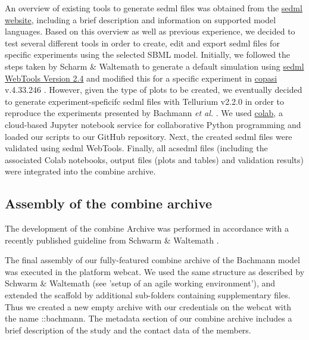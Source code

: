 An overview of existing tools to generate \ac{sedml} files was obtained from the \hyperlink{http://sed-ml.org/}{\acs{sedml} website}, including a brief description and information on supported model languages. Based on this overview as well as previous experience, we decided to test several different tools in order to create, edit and export \ac{sedml} files for specific experiments using the selected SBML model. 
Initially, we followed the steps taken by Scharm \& Waltemath \cite{combine} to generate a default simulation using \hyperlink{http://sysbioapps.spdns.org/SED-ML_Web_Tools}{\acs{sedml} WebTools Version 2.4} and modified this for a specific experiment in \hyperlink{http://copasi.org/}{\ac{copasi}} v.4.33.246 \cite{copasi}. However, given the type of plots to be created, we eventually decided to generate experiment-speficifc \ac{sedml} files with Tellurium v2.2.0 \cite{tellurium} in order to reproduce the experiments presented by Bachmann \textit{et al.} \cite{bachmannmodel}. We used \hyperlink{https://colab.research.google.com/notebooks/welcome.ipynb}{\ac{colab}}, a cloud-based Jupyter notebook service for collaborative Python programming and loaded our scripts to our GitHub repository. Next, the created \ac{sedml} files were validated using \ac{sedml} WebTools. Finally, all ac{sedml} files (including the associated Colab notebooks, output files (plots and tables) and validation results) were integrated into the \ac{combine} archive.

\subsection*{Assembly of the \acs{combine} archive}

The development of the \ac{combine} Archive was performed in accordance with a recently published guideline from Schwarm \& Waltemath \cite{combine}.

The final assembly of our fully-featured \ac{combine} archive of the Bachmann model was executed in the platform \ac{webcat}. We used the same structure as described by Schwarm \& Waltemath (see 'setup of an agile working environment'), and extended the scaffold by additional sub-folders containing supplementary files. Thus we created a new empty archive with our credentials on the \ac{webcat} with the name \textsf{::bachmann}. The metadata section of our \ac{combine} archive includes a brief description of the study and the contact data of the members.

